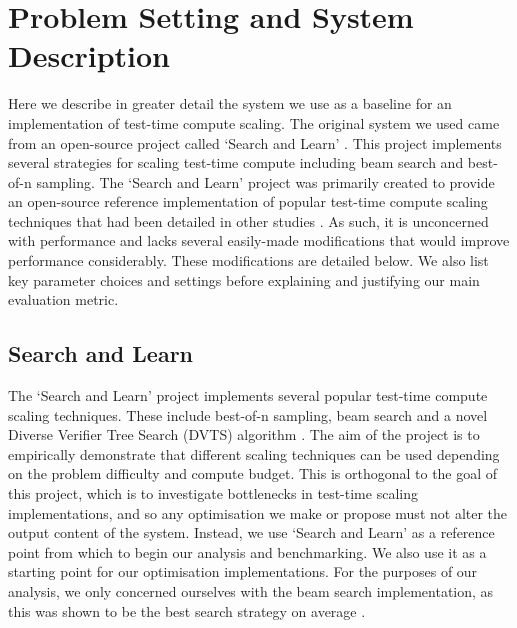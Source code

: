 \documentclass[12pt,twoside]{report}
\begin{document}
\chapter{Problem Setting and System Description}

Here we describe in greater detail the system we use as a baseline for an implementation of test-time compute scaling. 
The original system we used came from an open-source project called `Search and Learn' \cite{beeching2024scalingtesttimecompute}.
This project implements several strategies for scaling test-time compute including beam search and best-of-n sampling. 
The `Search and Learn' project was primarily created to provide an open-source reference implementation of popular test-time compute scaling techniques that had been detailed in other studies \cite{snell2024scaling}.
As such, it is unconcerned with performance and lacks several easily-made modifications that would improve performance considerably.
These modifications are detailed below. 
We also list key parameter choices and settings before explaining and justifying our main evaluation metric.

\section{Search and Learn}
The `Search and Learn' project implements several popular test-time compute scaling techniques. 
These include best-of-n sampling, beam search and a novel Diverse Verifier Tree Search (DVTS) algorithm \cite{beeching2024scalingtesttimecompute}.
The aim of the project is to empirically demonstrate that different scaling techniques can be used depending on the problem difficulty and compute budget.
This is orthogonal to the goal of this project, which is to investigate bottlenecks in test-time scaling implementations, and so any optimisation we make or propose must not alter the output content of the system. 
Instead, we use `Search and Learn' as a reference point from which to begin our analysis and benchmarking.
We also use it as a starting point for our optimisation implementations.
For the purposes of our analysis, we only concerned ourselves with the beam search implementation, as this was shown to be the best search strategy on average \cite{beeching2024scalingtesttimecompute}.
\end{document}
